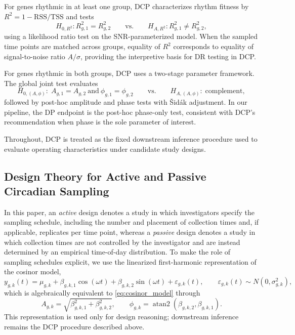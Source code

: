 \documentclass{article}
\begin{document}
For genes rhythmic in at least one group, DCP characterizes rhythm fitness by
$R^2=1-\mathrm{RSS}/\mathrm{TSS}$ and tests
\begin{equation}
H_{0,R^2}: R_{g,1}^2 = R_{g,2}^2
\qquad \text{vs.} \qquad
H_{A,R^2}: R_{g,1}^2 \neq R_{g,2}^2,
\label{eq:dr_r2_hyp}
\end{equation}
using a likelihood ratio test on the SNR-parameterized model.
When the sampled time points are matched across groups, equality of $R^2$
corresponds to equality of signal-to-noise ratio $A/\sigma$, providing the
interpretive basis for DR testing in DCP.

For genes rhythmic in both groups, DCP uses a two-stage parameter framework.
The global joint test evaluates
\begin{equation}
H_{0,(A,\phi)}:\; A_{g,1}=A_{g,2}\ \text{and}\ \phi_{g,1}=\phi_{g,2}
\qquad \text{vs.} \qquad
H_{A,(A,\phi)}:\; \text{complement},
\label{eq:dp_hyp}
\end{equation}
followed by post-hoc amplitude and phase tests with \v{S}id\'{a}k adjustment.
In our pipeline, the DP endpoint is the post-hoc phase-only test, consistent
with DCP’s recommendation when phase is the sole parameter of interest.

Throughout, DCP is treated as the fixed downstream inference procedure used to
evaluate operating characteristics under candidate study designs.

\subsection{Design Theory for Active and Passive Circadian Sampling}
\label{sec:design_theory}

In this paper, an \emph{active} design denotes a study in which investigators
specify the sampling schedule, including the number and placement of collection
times and, if applicable, replicates per time point, whereas a \emph{passive}
design denotes a study in which collection times are not controlled by the
investigator and are instead determined by an empirical time-of-day distribution. To make the role of sampling schedules explicit, we use the linearized
first-harmonic representation of the cosinor model,
\begin{equation}
y_{g,k}(t)
=
\mu_{g,k}
+
\beta_{g,k,1}\cos(\omega t)
+
\beta_{g,k,2}\sin(\omega t)
+
\varepsilon_{g,k}(t),
\qquad
\varepsilon_{g,k}(t)\sim N(0,\sigma_{g,k}^2),
\label{eq:cosinor_linear}
\end{equation}
which is algebraically equivalent to \eqref{eq:cosinor_model} through
\begin{equation}
A_{g,k}=\sqrt{\beta_{g,k,1}^2+\beta_{g,k,2}^2},
\qquad
\phi_{g,k}=\operatorname{atan2}\!\left(\beta_{g,k,2},\beta_{g,k,1}\right).
\label{eq:beta_to_phase}
\end{equation}
This representation is used only for design reasoning; downstream inference
remains the DCP procedure described above.
\end{document}
